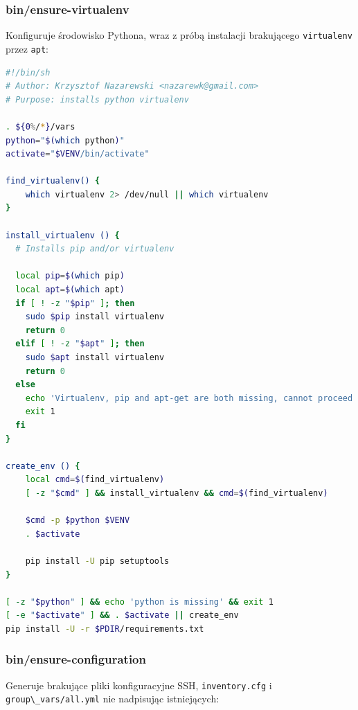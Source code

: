 \documentclass[a4paper,12pt,twoside,openany]{report}
\newcommand{\passthrough}[1]{#1}
\begin{document}
\hypertarget{binensure-virtualenv}{%
\subsubsection{bin/ensure-virtualenv}\label{binensure-virtualenv}}

Konfiguruje środowisko Pythona, wraz z próbą instalacji brakującego
\passthrough{\lstinline!virtualenv!} przez
\passthrough{\lstinline!apt!}:

\begin{lstlisting}[language=bash]
#!/bin/sh
# Author: Krzysztof Nazarewski <nazarewk@gmail.com>
# Purpose: installs python virtualenv

. ${0%/*}/vars
python="$(which python)"
activate="$VENV/bin/activate"

find_virtualenv() {
    which virtualenv 2> /dev/null || which virtualenv
}

install_virtualenv () {
  # Installs pip and/or virtualenv

  local pip=$(which pip)
  local apt=$(which apt)
  if [ ! -z "$pip" ]; then
    sudo $pip install virtualenv
    return 0
  elif [ ! -z "$apt" ]; then
    sudo $apt install virtualenv
    return 0
  else
    echo 'Virtualenv, pip and apt-get are both missing, cannot proceed'
    exit 1
  fi
}

create_env () {
    local cmd=$(find_virtualenv)
    [ -z "$cmd" ] && install_virtualenv && cmd=$(find_virtualenv)

    $cmd -p $python $VENV
    . $activate

    pip install -U pip setuptools
}

[ -z "$python" ] && echo 'python is missing' && exit 1
[ -e "$activate" ] && . $activate || create_env
pip install -U -r $PDIR/requirements.txt
\end{lstlisting}

\hypertarget{binensure-configuration}{%
\subsubsection{bin/ensure-configuration}\label{binensure-configuration}}

Generuje brakujące pliki konfiguracyjne SSH,
\passthrough{\lstinline!inventory.cfg!} i
\passthrough{\lstinline!group\_vars/all.yml!} nie nadpisując
istniejących:
\end{document}
